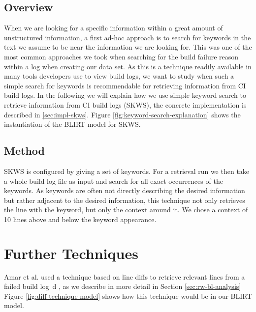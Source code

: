 \documentclass[\myrootdir/main.tex]{subfiles}
\begin{document}
\subsection{Overview}
When we are looking for a specific information within a great amount of unstructured information, a first ad-hoc approach is to search for keywords in the text we assume to be near the information we are looking for.
This was one of the most common approaches we took when searching for the build failure reason within a log when creating our data set.
As this is a technique readily available in many tools developers use to view build logs, we want to study when such a simple search for keywords is recommendable for retrieving information from CI build logs.
In the following we will explain how we use simple keyword search to retrieve information from CI build logs (SKWS), the concrete implementation is described in \ref{sec:impl-skws}.
Figure \ref{fig:keyword-search-explanation} shows the instantiation of the BLIRT model for SKWS.

\subsection{Method}
SKWS is configured by giving a set of keywords.
For a retrieval run we then take a whole build log file as input and search for all exact occurrences of the keywords.
As keywords are often not directly describing the desired information but rather adjacent to the desired information, this technique not only retrieves the line with the keyword, but only the context around it.
We chose a context of 10 lines above and below the keyword appearance.

\section{Further Techniques}

Amar et al. used a technique based on line diffs to retrieve relevant lines from a failed build log~\cite{amar2019mining}d \cite{amar2019mining}, as we describe in more detail in Section \ref{sec:rw-bl-analysis}
Figure \ref{fig:diff-technique-model} shows how this technique would be in our BLIRT model.
\end{document}
